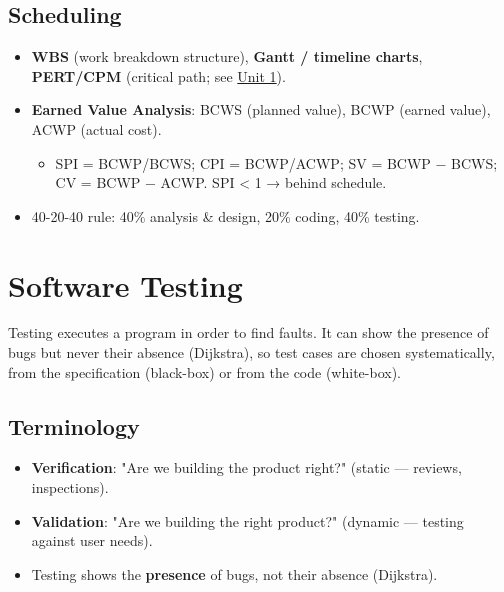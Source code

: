 \needspace{95pt}

\hypertarget{p2-06--53-scheduling}{%
\subsection{Scheduling}\label{p2-06--53-scheduling}}

\begin{itemize}
\tightlist
\item
  \textbf{WBS} (work breakdown structure), \textbf{Gantt / timeline charts}, \textbf{PERT/CPM} (critical path; see \protect\hyperlink{p2-01--75-pert-cpm}{Unit 1}).
\item
  \textbf{Earned Value Analysis}: BCWS (planned value), BCWP (earned value), ACWP (actual cost).

  \begin{itemize}
  \tightlist
  \item
    SPI = BCWP/BCWS; CPI = BCWP/ACWP; SV = BCWP − BCWS; CV = BCWP − ACWP. SPI \textless{} 1 → behind schedule.
  \end{itemize}
\item
  40-20-40 rule: 40\% analysis \& design, 20\% coding, 40\% testing.
\end{itemize}

\needspace{161pt}

\hypertarget{p2-06--6-software-testing}{%
\section{Software Testing}\label{p2-06--6-software-testing}}

Testing executes a program in order to find faults. It can show the presence of bugs but never their absence
(Dijkstra), so test cases are chosen systematically, from the specification (black-box) or from the code
(white-box).

\needspace{95pt}

\hypertarget{p2-06--61-terminology}{%
\subsection{Terminology}\label{p2-06--61-terminology}}



\begin{itemize}
\tightlist
\item
  \textbf{Verification}: "Are we building the product right?" (static --- reviews, inspections).
\item
  \textbf{Validation}: "Are we building the right product?" (dynamic --- testing against user needs).
\item
  Testing shows the \textbf{presence} of bugs, not their absence (Dijkstra).
\end{itemize}


